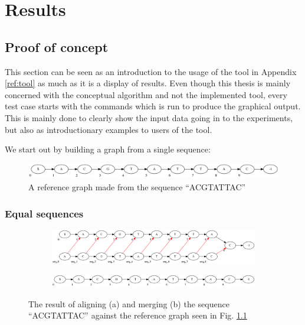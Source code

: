 \documentclass[thesis.tex]{subfiles}
\begin{document}
\chapter{Results}
\section{Proof of concept}
This section can be seen as an introduction to the usage of the tool in Appendix \ref{ref:tool} as much as it is a display of results. Even though this thesis is mainly concerned with the conceptual algorithm and not the implemented tool, every test case starts with the commands which is run to produce the graphical output. This is mainly done to clearly show the input data going in to the experiments, but also as introductionary examples to users of the tool. 
\par\noindent
We start out by building a graph from a single sequence:\\
\begin{figure}[H]
  \begin{mdframed}
    \includegraphics[width=\textwidth]{outputs/equal-merge.png}
  \end{mdframed}
  \caption{A reference graph made from the sequence ``ACGTATTAC''}
  \label{fig:output_ref}
\end{figure}
\subsection{Equal sequences}
\begin{figure}[H]
  \begin{subfigure}[t]{\textwidth}
    \begin{mdframed}
      \includegraphics[width=\textwidth]{outputs/equal-alignment.png}
    \end{mdframed}
    \subcaption{}
  \end{subfigure}
  \begin{subfigure}[t]{\textwidth}
    \begin{mdframed}
      \includegraphics[width=\textwidth]{outputs/equal-merge.png}
    \end{mdframed}
    \subcaption{}
  \end{subfigure}
  \caption{The result of aligning (a) and merging (b) the sequence ``ACGTATTAC'' against the reference graph seen in Fig. \ref{fig:output_ref}}
  \label{fig:output_equal}
\end{figure}
\end{document}
